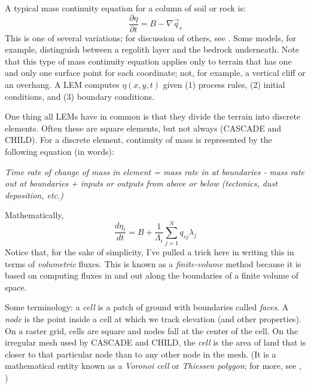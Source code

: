 \documentclass[12pt]{amsart}
\begin{document}
A typical mass continuity equation for a column of soil or rock is:
\begin{equation}
\frac{\partial \eta}{\partial t} = B - \nabla \vec{q}_s
\end{equation}
This is one of several variations; for discussion of others, see \cite{tucker2010modelling}. Some models, for example, distinguish between a regolith layer and the bedrock underneath. Note that this type of mass continuity equation applies only to terrain that has one and only one surface point for each coordinate; not, for example, a vertical cliff or an overhang. A LEM computes $\eta (x,y,t)$ given (1) process rules, (2) initial conditions, and (3) boundary conditions.

One thing all LEMs have in common is that they divide the terrain into discrete elements. Often these are square elements, but not always (CASCADE and CHILD). For a discrete element, continuity of mass is represented by the following equation (in words):

{\em Time rate of change of mass in element = mass rate in at boundaries - mass rate out at boundaries + inputs or outputs from above or below (tectonics, dust deposition, etc.)}

Mathematically, 
\begin{equation}
\label{eq:finvol}
\frac{d\eta_i}{dt} = B + \frac{1}{\Lambda_i} \sum_{j=1}^N q_{sj} \lambda_j
\end{equation}
Notice that, for the sake of simplicity, I've pulled a trick here in writing this in terms of {\em volumetric} fluxes. This is known as a {\em finite-volume} method because it is based on computing fluxes in and out along the boundaries of a finite volume of space.

Some terminology: a {\em cell} is a patch of ground with boundaries called {\em faces}. A {\em node} is the point inside a cell at which we track elevation (and other properties). On a raster grid, cells are square and nodes fall at the center of the cell. On the irregular mesh used by CASCADE and CHILD, the {\em cell} is the area of land that is closer to that particular node than to any other node in the mesh. (It is a mathematical entity known as a {\em Voronoi cell} or {\em Thiessen polygon}; for more, see \citet{braun1997modelling}, \citet{tucker2001object})
\end{document}
